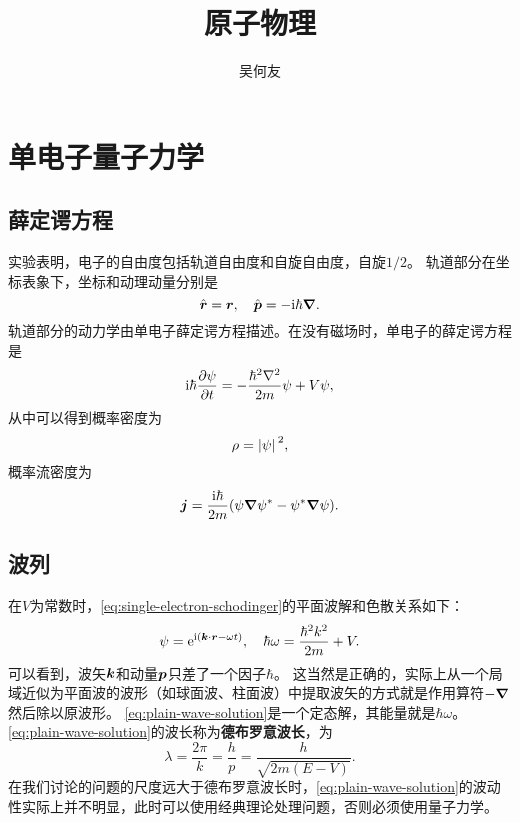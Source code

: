 \documentclass[UTF8, a4paper]{ctexart}
\title{原子物理}
\author{吴何友}
\newcommand*{\ee}{\mathrm{e}}
\newcommand*{\ii}{\mathrm{i}}
\begin{document}
\maketitle

\section{单电子量子力学}

\subsection{薛定谔方程}

实验表明，电子的自由度包括轨道自由度和自旋自由度，自旋$1/2$。
轨道部分在坐标表象下，坐标和动理动量分别是
\begin{equation}
    \hat{\vb*{r}} = \vb*{r}, \quad \hat{\vb*{p}} = -\ii \hbar \grad.
    \label{eq:single-electron-schodinger}
\end{equation}
轨道部分的动力学由单电子薛定谔方程描述。在没有磁场时，单电子的薛定谔方程是
\begin{equation}
    \ii \hbar \pdv{\psi}{t} = - \frac{\hbar^2 \laplacian}{2m} \psi + V \psi,
\end{equation}
从中可以得到概率密度为
\begin{equation}
    \rho = \abs*{\psi}^2,
\end{equation}
概率流密度为
\begin{equation}
    \vb*{j} = \frac{\ii \hbar}{2m} (\psi \grad{\psi^*} - \psi^* \grad{\psi}).
\end{equation}

\subsection{波列}

在$V$为常数时，\eqref{eq:single-electron-schodinger}的平面波解和色散关系如下：
\begin{equation}
    \psi = \ee^{\ii(\vb*{k} \cdot \vb*{r} - \omega t)}, \quad \hbar \omega = \frac{\hbar^2 k^2}{2m} + V.
    \label{eq:plain-wave-solution}
\end{equation}
可以看到，波矢$\vb*{k}$和动量$\vb*{p}$只差了一个因子$\hbar$。
这当然是正确的，实际上从一个局域近似为平面波的波形（如球面波、柱面波）中提取波矢的方式就是作用算符$-\grad$然后除以原波形。
\eqref{eq:plain-wave-solution}是一个定态解，其能量就是$\hbar \omega$。
\eqref{eq:plain-wave-solution}的波长称为\textbf{德布罗意波长}，为
\begin{equation}
    \lambda = \frac{2\pi}{k} = \frac{h}{p} = \frac{h}{\sqrt{2m(E-V)}}.
\end{equation}
在我们讨论的问题的尺度远大于德布罗意波长时，\eqref{eq:plain-wave-solution}的波动性实际上并不明显，此时可以使用经典理论处理问题，否则必须使用量子力学。
\end{document}
